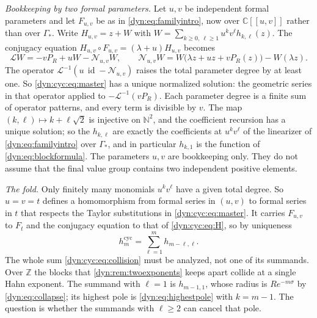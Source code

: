 \documentclass[11pt,letterpaper]{article}
\theoremstyle{definition}
\theoremstyle{remark}
\newcommand{\C}{\mathbb C}
\newcommand{\Z}{\mathbb Z}
\newcommand{\N}{\mathbb N}
\newcommand{\id}{\operatorname{id}}
\newcommand{\Li}{\mathcal L}
\newcommand{\NN}{\mathcal N}
\numberwithin{equation}{section}
\begin{document}
\emph{Bookkeeping by two formal parameters.} Let $u,v$ be independent
formal parameters and let $F_{u,v}$ be as in \eqref{dyn:eq:familyintro},
now over $\C[[u,v]]$ rather than over $\Gamma_{*}$. Write
$H_{u,v}=z+W$ with $W=\sum_{k\ge0,\ \ell\ge1}u^{k}v^{\ell}h_{k,\ell}(z)$.
The conjugacy equation $H_{u,v}\circ F_{u,v}=(\lambda+u)H_{u,v}$ becomes
\begin{equation}\label{dyn:cyc:eq:master}
 \Li W=-vP_R+uW-\NN_{u,v}W,\qquad
 \NN_{u,v}W=W\bigl(\lambda z+uz+vP_R(z)\bigr)-W(\lambda z).
\end{equation}
The operator $\Li^{-1}(u\,\id-\NN_{u,v})$ raises the total parameter degree
by at least one. So \eqref{dyn:cyc:eq:master} has a unique normalized
solution: the geometric series in that operator applied to
$-\Li^{-1}(vP_R)$. Each parameter degree is a finite sum of operator
patterns, and every term is divisible by $v$. The map
$(k,\ell)\mapsto k+\ell\sqrt2$ is injective on $\N^{2}$, and the coefficient
recursion has a unique solution; so the $h_{k,\ell}$ are exactly the
coefficients at $u^{k}v^{\ell}$ of the linearizer of
\eqref{dyn:eq:familyintro} over $\Gamma_{*}$, and in particular
$h_{k,1}$ is the function of \eqref{dyn:eq:blockformula}. The parameters
$u,v$ are bookkeeping only. They do not assume that the final value group
contains two independent positive elements.

\emph{The fold.} Only finitely many monomials $u^{k}v^{\ell}$ have a given
total degree. So $u=v=t$ defines a homomorphism from formal series in
$(u,v)$ to formal series in $t$ that respects the Taylor substitutions in
\eqref{dyn:cyc:eq:master}. It carries $F_{u,v}$ to $F_t$ and the conjugacy
equation to that of \eqref{dyn:cyc:eq:H}, so by uniqueness
\begin{equation}\label{dyn:cyc:eq:collision}
 h^{\mathrm{cyc}}_m=\sum_{\ell=1}^{m}h_{m-\ell,\ell}.
\end{equation}
The whole sum \eqref{dyn:cyc:eq:collision} must be analyzed, not one of its
summands. Over $\Z$ the blocks that \cref{dyn:rem:twoexponents} keeps apart
collide at a single Hahn exponent. The summand with $\ell=1$ is $h_{m-1,1}$,
whose radius is $Re^{-m\sigma}$ by \eqref{dyn:eq:collapse}; its highest pole
is \eqref{dyn:eq:highestpole} with $k=m-1$. The question is whether the
summands with $\ell\ge2$ can cancel that pole.
\end{document}
